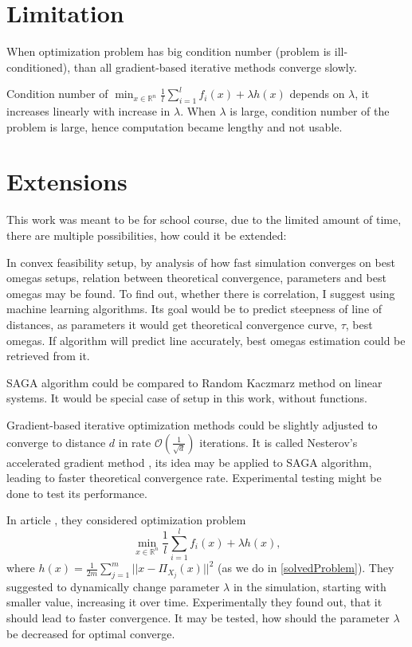 \documentclass[11pt]{book}
\newcommand{\R}{\mathbb{R}}
\begin{document}
\section{Limitation}
When optimization problem has big condition number (problem is ill-conditioned), than all gradient-based iterative methods converge slowly.

Condition number of $ \min_{x \in \R^n} \frac{1}{l}\sum_{i=1}^l f_i(x) + \lambda h(x)$ depends on $\lambda$, it increases linearly with increase in $\lambda$. When $\lambda$ is large, condition number of the problem is large, hence computation became lengthy and not usable.

\section{Extensions}
This work was meant to be for school course, due to the limited amount of time, there are multiple possibilities, how could it be extended:

\begin{list}{•}{}
\item In convex feasibility setup, by analysis of how fast simulation converges on best omegas setups, relation between theoretical convergence, parameters and best omegas may be found. To find out, whether there is correlation, I suggest using machine learning algorithms. Its goal would be to predict steepness of line of distances, as parameters it would get theoretical convergence curve, $\tau$, best omegas. If algorithm will predict line accurately, best omegas estimation could be retrieved from it.

\item SAGA algorithm could be compared to Random Kaczmarz method on linear systems. It would be special case of setup in this work, without functions.

\item Gradient-based iterative optimization methods could be slightly adjusted to converge to distance $d$ in rate $\mathcal{O}(\frac{1}{\sqrt{d}})$ iterations. It is called Nesterov's accelerated gradient method \cite{acceleration}, its idea may be applied to SAGA algorithm, leading to faster theoretical convergence rate. Experimental testing might be done to test its performance.

\item In article \cite{kosto}, they considered optimization problem $$ \min_{x \in \R^n} \frac{1}{l}\sum_{i=1}^l f_i(x) + \lambda h(x),$$ where $h(x)=\frac{1}{2m}\sum_{j=1}^m ||x-\Pi_{X_j}(x)||^2$ (as we do in \ref{solvedProblem}). They suggested to dynamically change parameter $\lambda$ in the simulation, starting with smaller value, increasing it over time. Experimentally they found out, that it should lead to faster convergence. It may be tested, how should the parameter $\lambda$ be decreased for optimal converge.
\end{list}



\end{document}
